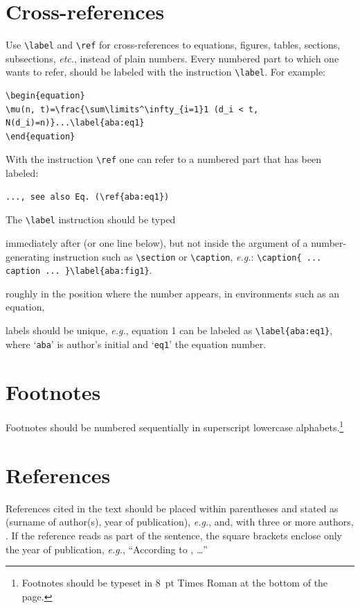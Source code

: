 \documentclass{ws-jai}
\begin{document}
\section{Cross-references}
Use \verb|\label| and \verb|\ref| for cross-references to
equations, figures, tables, sections, subsections, {\it etc.}, instead
of plain numbers. Every numbered part to which one wants to refer,
should be labeled with the instruction \verb|\label|.
For example:
\begin{verbatim}
\begin{equation}
\mu(n, t)=\frac{\sum\limits^\infty_{i=1}1 (d_i < t, N(d_i)=n)}...\label{aba:eq1}
\end{equation}
\end{verbatim}
With the instruction \verb|\ref| one can refer to a numbered part
that has been labeled:
\begin{verbatim}
..., see also Eq. (\ref{aba:eq1})
\end{verbatim}

The \verb|\label| instruction should be typed
\begin{itemlist}
\item immediately after (or one line below), but not inside the argument of
a number-generating instruction such as \verb|\section| or \verb|\caption|, {\it e.g.}:
\verb|\caption{ ... caption ... }\label{aba:fig1}|.
\item roughly in the position where the number appears, in environments
such as an equation,
\item labels should be unique, {\it e.g.}, equation 1 can be labeled as
\verb|\label{aba:eq1}|, where `{\tt aba}' is author's initial and
`{\tt eq1}' the equation number.
\end{itemlist}

\section{Footnotes}
Footnotes should be numbered sequentially in superscript
lowercase alphabets.\footnote{Footnotes should be
typeset in 8~pt Times Roman at the bottom of the page.}

\section{References}
References cited in the text should be placed within parentheses and stated as (surname of author(s), year of
publication), {\it e.g.}, \cite{Golub89} and, with three
or more authors, \cite{blain02}. If the reference reads as part of
the sentence, the square brackets enclose only the year of
publication, {\it e.g.}, ``According to \citet{Golub89}, \ldots''
\end{document}

